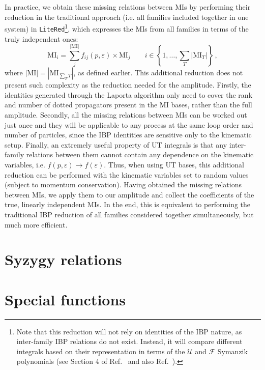 \documentclass[main.tex]{subfiles}
\begin{document}
In practice, we obtain these missing relations between MIs by performing their reduction in the traditional approach (i.e. all families included together in one system) in \texttt{LiteRed}\footnote{Note that this reduction will not rely on identities of the IBP nature, as inter-family IBP relations do not exist. Instead, it will compare different integrals based on their representation in terms of the $\mathcal{U}$ and $\mathcal{F}$ Symanzik polynomials (see Section 4 of Ref.~\cite{Lee:2012cn} and also Ref.~\cite{Pak:2011xt}).}, which expresses the MIs from all families in terms of the truly independent ones:
\begin{equation}
    \text{MI}_{i} = \sum_j^{|\text{MI}|} f_{ij}(p, \varepsilon) \times \text{MI}_j \qquad i \in \left\{1, \ldots, \sum_T |\text{MI}_T|\right\}\,,
\end{equation}
where $|\text{MI}| = |\text{MI}_{\sum_T T}|$, as defined earlier. This additional reduction does not present such complexity as the reduction needed for the amplitude. Firstly, the identities generated through the Laporta algorithm only need to cover the rank and number of dotted propagators present in the MI bases, rather than the full amplitude. Secondly, all the missing relations between MIs can be worked out just once and they will be applicable to any process at the same loop order and number of particles, since the IBP identities are sensitive only to the kinematic setup. Finally, an extremely useful property of UT integrals is that any inter-family relations between them cannot contain any dependence on the kinematic variables, i.e. $f(p, \varepsilon) \rightarrow f(\varepsilon)$. Thus, when using UT bases, this additional reduction can be performed with the kinematic variables set to random values (subject to momentum conservation). Having obtained the missing relations between MIs, we apply them to our amplitude and collect the coefficients of the true, linearly independent MIs. In the end, this is equivalent to performing the traditional IBP reduction of all families considered together simultaneously, but much more efficient.
\section{Syzygy relations} \label{sec:syzygies} 
%
\section{Special functions} \label{sec:specialfunctions}
\end{document}
